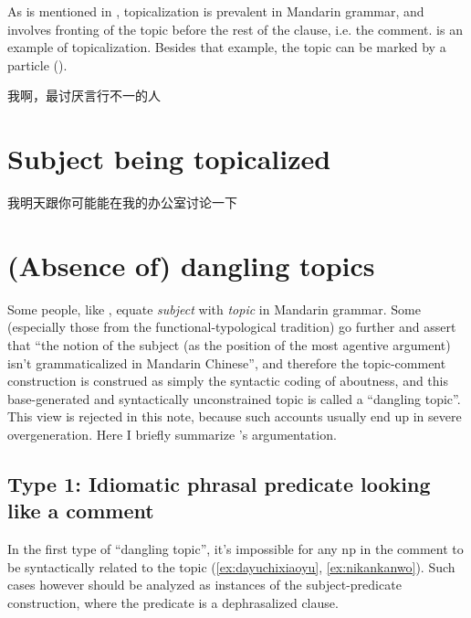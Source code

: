 \documentclass[UTF8, a4paper, oneside, scheme=plain, 12pt]{ctexrep}
\newcommand*{\citesec}[1]{\S~{#1}}
\newcommand*{\term}[1]{\emph{#1}}
\begin{document}
As is mentioned in ,
topicalization is prevalent in Mandarin grammar,
and involves fronting of the topic before the rest of the clause, i.e. the comment.
 is an example of topicalization.
Besides that example, the topic can be marked by a particle
().

\begin{exe}
    \ex\label{ex:information.topic.marker.1} 我啊，最讨厌言行不一的人
\end{exe}

\section{Subject being topicalized}\label{sec:topic.subject}

\begin{exe}
    \ex 我明天跟你可能能在我的办公室讨论一下
\end{exe}

\section{(Absence of) dangling topics}\label{sec:topic-subject}

Some people, like \citet[\citesec{7.1}]{zhudexigrammar},
equate \term{subject} with \term{topic} in Mandarin grammar.
Some (especially those from the functional-typological tradition) go further 
and assert that ``the notion of the subject (as the position of the most agentive argument) 
isn't grammaticalized in Mandarin Chinese'',
and therefore the topic-comment construction 
is construed as simply the syntactic coding of aboutness,
and this base-generated and syntactically unconstrained topic 
is called a ``dangling topic''.
This view is rejected in this note,
because such accounts usually end up in severe overgeneration. 
Here I briefly summarize \citet{sih2000topic}'s argumentation.

\subsection{Type 1: Idiomatic phrasal predicate looking like a comment}\label{sec:clause.dangling-topic.1}

In the first type of ``dangling topic'',
it's impossible for any \acs{np} in the comment to be syntactically related to the topic
(\ref{ex:dayuchixiaoyu}, \ref{ex:nikankanwo}).
Such cases however should be analyzed as instances of the
subject-predicate construction,
where the predicate is a dephrasalized clause.
\end{document}
